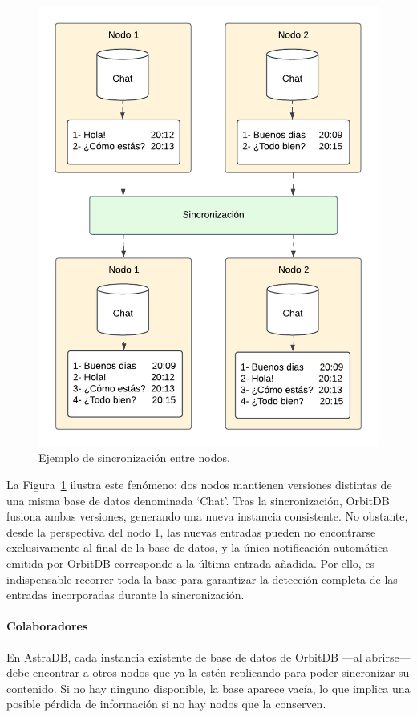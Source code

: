 \begin{figure}[H]
\centering
\includegraphics[width=0.7\linewidth]{img/solucion-ipfs/ejemplo-sincronizacion.png}
\caption{Ejemplo de sincronización entre nodos.}
\label{fig:ejemplo-sincronizacion}
\end{figure}

La Figura~\ref{fig:ejemplo-sincronizacion} ilustra este fenómeno: dos nodos mantienen versiones distintas de una misma base de datos denominada ‘Chat’. Tras la sincronización, OrbitDB fusiona ambas versiones, generando una nueva instancia consistente. No obstante, desde la perspectiva del nodo 1, las nuevas entradas pueden no encontrarse exclusivamente al final de la base de datos, y la única notificación automática emitida por OrbitDB corresponde a la última entrada añadida. Por ello, es indispensable recorrer toda la base para garantizar la detección completa de las entradas incorporadas durante la sincronización.

\paragraph{Colaboradores}

En AstraDB, cada instancia existente de base de datos de OrbitDB —al abrirse— debe encontrar a otros nodos que ya la estén replicando para poder sincronizar su contenido. Si no hay ninguno disponible, la base aparece vacía, lo que implica una posible pérdida de información si no hay nodos que la conserven.

